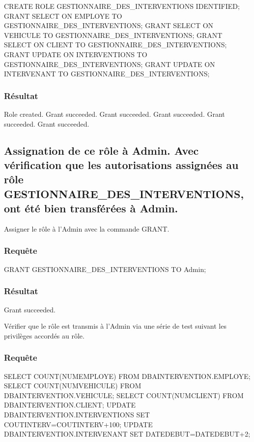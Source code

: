 \documentclass[•]{article}
\begin{document}
\begin{sql}
CREATE ROLE GESTIONNAIRE_DES_INTERVENTIONS IDENTIFIED;
GRANT SELECT ON EMPLOYE TO GESTIONNAIRE_DES_INTERVENTIONS;
GRANT SELECT ON VEHICULE TO GESTIONNAIRE_DES_INTERVENTIONS;
GRANT SELECT ON CLIENT TO GESTIONNAIRE_DES_INTERVENTIONS;
GRANT UPDATE ON INTERVENTIONS TO GESTIONNAIRE_DES_INTERVENTIONS;
GRANT UPDATE ON INTERVENANT TO GESTIONNAIRE_DES_INTERVENTIONS;
\end{sql}

\subsubsection{Résultat}
\begin{sql}
Role created.
Grant succeeded.
Grant succeeded.
Grant succeeded.
Grant succeeded.
Grant succeeded.
\end{sql}



\subsection{Assignation de ce rôle à Admin. Avec vérification que les autorisations assignées au rôle GESTIONNAIRE\_DES\_INTERVENTIONS, ont été bien transférées à Admin.}

\textrm{Assigner le rôle à l'Admin avec la commande GRANT.}
\subsubsection{Requête}
\begin{sql}
GRANT GESTIONNAIRE_DES_INTERVENTIONS TO Admin;
\end{sql}
\subsubsection{Résultat}
\begin{sql}
Grant succeeded.
\end{sql}

\textrm{Vérifier que le rôle est transmis à l'Admin via une série de test suivant les privilèges accordés au rôle.}
\subsubsection{Requête}
\begin{sql}
SELECT COUNT(NUMEMPLOYE) FROM DBAINTERVENTION.EMPLOYE;
SELECT COUNT(NUMVEHICULE) FROM DBAINTERVENTION.VEHICULE;
SELECT COUNT(NUMCLIENT) FROM DBAINTERVENTION.CLIENT;
UPDATE DBAINTERVENTION.INTERVENTIONS SET COUTINTERV=COUTINTERV+100;
UPDATE DBAINTERVENTION.INTERVENANT SET DATEDEBUT=DATEDEBUT+2;
	
\end{sql}
\end{document}
